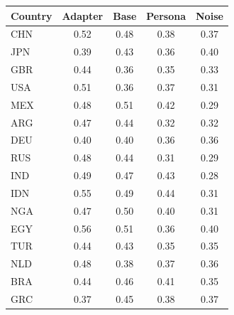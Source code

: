 \begin{tabular}{lcccc}
\toprule
Country & Adapter & Base & Persona & Noise \\
\midrule
CHN & 0.52 & 0.48 & 0.38 & 0.37 \\
JPN & 0.39 & 0.43 & 0.36 & 0.40 \\
GBR & 0.44 & 0.36 & 0.35 & 0.33 \\
USA & 0.51 & 0.36 & 0.37 & 0.31 \\
MEX & 0.48 & 0.51 & 0.42 & 0.29 \\
ARG & 0.47 & 0.44 & 0.32 & 0.32 \\
DEU & 0.40 & 0.40 & 0.36 & 0.36 \\
RUS & 0.48 & 0.44 & 0.31 & 0.29 \\
IND & 0.49 & 0.47 & 0.43 & 0.28 \\
IDN & 0.55 & 0.49 & 0.44 & 0.31 \\
NGA & 0.47 & 0.50 & 0.40 & 0.31 \\
EGY & 0.56 & 0.51 & 0.36 & 0.40 \\
TUR & 0.44 & 0.43 & 0.35 & 0.35 \\
NLD & 0.48 & 0.38 & 0.37 & 0.36 \\
BRA & 0.44 & 0.46 & 0.41 & 0.35 \\
GRC & 0.37 & 0.45 & 0.38 & 0.37 \\
\bottomrule
\end{tabular}
